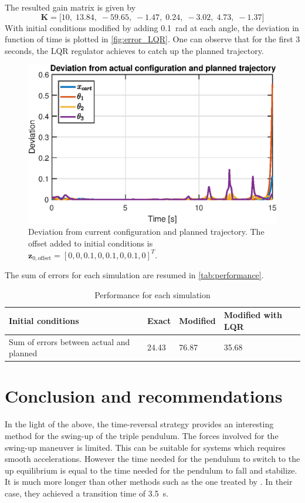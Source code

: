 \documentclass[a4paper,12pt]{article}
\begin{document}
The resulted gain matrix is given by
\begin{equation}
\mathbf{K}=\big[10,\;13.84,\;-59.65,\;-1.47,\;0.24,\;-3.02,\;4.73,\;-1.37\big]
\end{equation}
With initial conditions modified by adding \SI{0.1}{\radian} at each angle, the deviation in function of time is plotted in \autoref{fig:error_LQR}. One can observe that for the first 3 seconds, the LQR regulator achieves to catch up the planned trajectory.
\begin{figure}[h]
	\centering
	\includegraphics[width=12cm]{illustrations/graph_error_LQR.eps}
	\caption{Deviation from current configuration and planned trajectory. The offset added to initial conditions is $\mathbf{z}_{0,\text{offset}}=[0,0,0.1,0,0.1,0,0.1,0]^T$.}
	\label{fig:error_LQR}
\end{figure}

The sum of errors for each simulation are resumed in \autoref{tab:performance}.
\begin{table}[H]
\centering
\caption{Performance for each simulation}
\label{tab:performance}
\begin{tabular}{|l|l|l|l|}
\hline
Initial conditions                       & Exact & Modified & Modified with LQR \\ \hline
Sum of errors between actual and planned & 24.43 & 76.87    & 35.68             \\ \hline
\end{tabular}
\end{table}

\newpage
\section{Conclusion and recommendations}
In the light of the above, the time-reversal strategy provides an interesting method for the swing-up of the triple pendulum. The forces involved for the swing-up maneuver is limited. This can be suitable for systems which requires smooth accelerations. However the time needed for the pendulum to switch to the up equilibrium is equal to the time needed for the pendulum to fall and stabilize. It is much more longer than other methods such as the one treated by \citet{Gluck2013801}. In their case, they achieved a transition time of \SI{3.5}{\second}.
\end{document}
